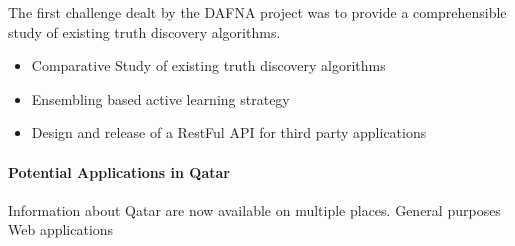 \documentclass[paper=a4, fontsize=11pt]{scrartcl}	%
\numberwithin{equation}{section}															%
\numberwithin{figure}{section}																%
\numberwithin{table}{section}																%
\begin{document}
 The first challenge dealt by the DAFNA project was to provide a comprehensible study of existing
 truth discovery algorithms. 
 
 \begin{itemize}
  \item Comparative Study of existing truth discovery algorithms
  \item Ensembling based active learning strategy 
  \item Design and release of a RestFul API for third party applications
 \end{itemize}
 \paragraph*{Potential Applications in Qatar}Information about Qatar are now available on multiple places. General 
 purposes Web applications 
\end{document}
